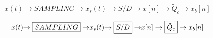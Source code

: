 \documentclass{article}
\newcommand {\arrowedbox}[1] {{\rightarrow\boxed{#1}\rightarrow}} %
\begin{document}
\[
x(t) \arrowedbox{SAMPLING} x_s(t) \arrowedbox{S/D} x[n] \rightarrow\boxed{\tilde{Q}_c}\rightarrow x_b[n]
\]

\[
x(t) \arrowedbox{SAMPLING} x_s(t) \arrowedbox{S/D} x[n] \rightarrow\fbox{$\tilde{Q}_c$}\rightarrow x_b[n]
\]
\end{document}

